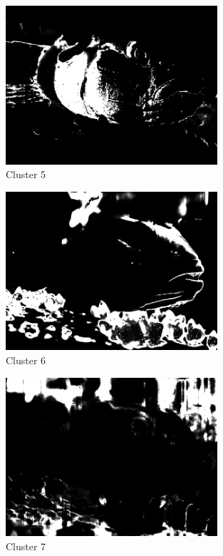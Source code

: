 \documentclass{article}      %
\begin{document}
\begin{figure}[H]
\centering
\includegraphics[width=0.7\textwidth]{partd_wts_cluster4}
\caption{Cluster 5}
\end{figure}

\begin{figure}[H]
\centering
\includegraphics[width=0.7\textwidth]{partd_wts_cluster5}
\caption{Cluster 6}
\end{figure}

\begin{figure}[H]
\centering
\includegraphics[width=0.7\textwidth]{partd_wts_cluster6}
\caption{Cluster 7}
\end{figure}
\end{document}
